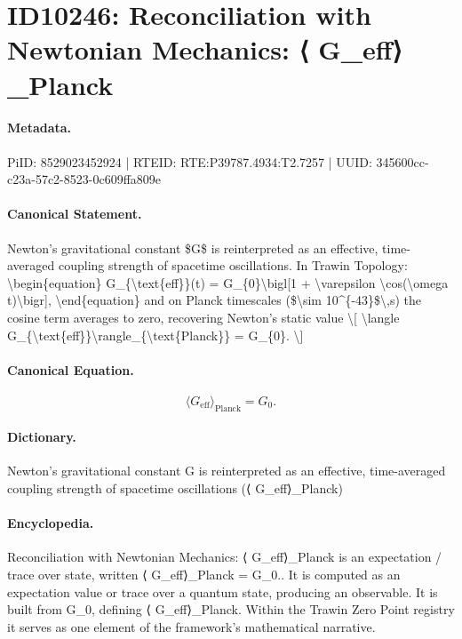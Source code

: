 \section*{ID10246: Reconciliation with Newtonian Mechanics: ⟨ G\_eff⟩\_Planck}
\paragraph{Metadata.}
PiID: 8529023452924 | RTEID: RTE:P39787.4934:T2.7257 | UUID: 345600cc-c23a-57c2-8523-0c609ffa809e

\paragraph{Canonical Statement.}
Newton's gravitational constant \$G\$ is reinterpreted as an effective, time-averaged coupling strength of spacetime oscillations. In Trawin Topology: \textbackslash{}begin\{equation\} G\_\{\textbackslash{}text\{eff\}\}(t) = G\_\{0\}\textbackslash{}bigl[1 + \textbackslash{}varepsilon \textbackslash{}cos(\textbackslash{}omega t)\textbackslash{}bigr], \textbackslash{}end\{equation\} and on Planck timescales (\$\textbackslash{}sim 10\textasciicircum{}\{-43\}\$\textbackslash{},s) the cosine term averages to zero, recovering Newton's static value \textbackslash{}[ \textbackslash{}langle G\_\{\textbackslash{}text\{eff\}\}\textbackslash{}rangle\_\{\textbackslash{}text\{Planck\}\} = G\_\{0\}. \textbackslash{}]

\paragraph{Canonical Equation.}
\[
\langle G_{\text{eff}}\rangle_{\text{Planck}} = G_{0}.
\]

\paragraph{Dictionary.}
Newton's gravitational constant G is reinterpreted as an effective, time-averaged coupling strength of spacetime oscillations (⟨ G\_eff⟩\_Planck)

\paragraph{Encyclopedia.}
Reconciliation with Newtonian Mechanics: ⟨ G\_eff⟩\_Planck is an expectation / trace over state, written ⟨ G\_eff⟩\_Planck = G\_0.. It is computed as an expectation value or trace over a quantum state, producing an observable. It is built from G\_0, defining ⟨ G\_eff⟩\_Planck. Within the Trawin Zero Point registry it serves as one element of the framework's mathematical narrative.
